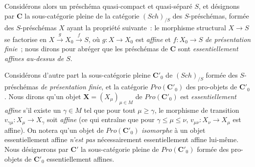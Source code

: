 \begin{env}[8.13.4]
\label{IV.8.13.4-fr}
Considérons alors un préschéma quasi-compact et quasi-séparé $S$, et désignons
par $\boldsymbol{C}$ la sous-catégorie pleine de la catégorie
$(\boldsymbol{\mathit{Sch}})_{/S}$ des $S$-préschémas, formée des $S$-préschémas $X$ ayant
la propriété suivante~: le morphisme structural $X\to S$ se factorise en
$X\xrightarrow{g}X_0\xrightarrow{f}S$,
où $g:X\to X_0$ est \emph{affine} et $f:X_0\to S$ \emph{de présentation finie}~; nous
dirons pour abréger que les préschémas de $\boldsymbol{C}$ sont
\emph{essentiellement affines au-dessus de $S$}.

Considérons d'autre part la sous-catégorie pleine $\boldsymbol{C}'_0$ de
$(\boldsymbol{\mathit{Sch}})_{/S}$ formée des $S$-préschémas \emph{de présentation finie},
et la catégorie $\boldsymbol{\mathit{Pro}}(\boldsymbol{C}'_0)$ des pro-objets de
$\boldsymbol{C}'_0$. Nous dirons qu'un objet
$\mathbf X=(X_\mu)_{\mu\in M}$ de $\boldsymbol{\mathit{Pro}}(\boldsymbol{C}'_0)$ est
\emph{essentiellement affine} s'il existe un $\gamma\in M$ tel que pour tout
$\mu\geqslant\gamma$, le morphisme de transition
$v_{\gamma\mu}:X_\mu\to X_\gamma$ soit \emph{affine} (ce qui entraîne que pour
$\gamma\leqslant\mu\leqslant\nu$, $v_{\mu\nu}:X_\nu\to X_\mu$ est affine).
On notera qu'un objet de $\boldsymbol{\mathit{Pro}}(\boldsymbol{C}'_0)$ \emph{isomorphe} à un
objet essentiellement affine \emph{n'est pas} nécessairement essentiellement
affine lui-même.
Nous désignerons par $\boldsymbol{C}'$ la sous-catégorie pleine de
$\boldsymbol{\mathit{Pro}}(\boldsymbol{C}'_0)$ formée des pro-objets de $\boldsymbol{C}'_0$
essentiellement affines.


\end{env}
